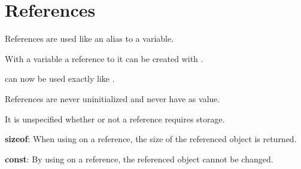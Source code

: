 \section{References}
    References are used like an alias to a variable. 

    With a variable  a reference to it can be created with . 
    
     can now be used exactly like .
    
    References are never uninitialized and never have  as value.

    It is unspecified whether or not a reference requires storage.

\textbf{sizeof}: When using  on a reference, the size of the referenced object is returned.

\textbf{const}: By using  on a reference, the referenced object cannot be changed.